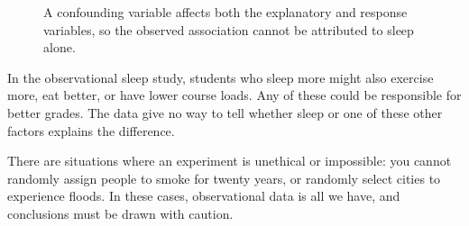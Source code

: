 \begin{figure}[htbp]
\centering
{}
\caption{A confounding variable affects both the explanatory and response variables, so the observed association cannot be attributed to sleep alone.}
\label{fig:confounding}
\end{figure}

In the observational sleep study, students who sleep more might also exercise more, eat better, or have lower course loads. 
Any of these could be responsible for better grades. The data give no way to tell whether sleep or one of these other factors explains the difference. 

There are situations where an experiment is unethical or impossible: you cannot randomly assign people to smoke for twenty years, 
or randomly select cities to experience floods. In these cases, observational data is all we have, and conclusions must be drawn 
with caution.

